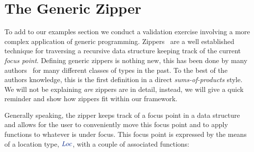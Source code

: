 \documentclass[screen,sigplan]{acmart}%
\newcommand*{\mathcolor}{}
\def\mathcolor#1#{\mathcoloraux{#1}}
\newcommand*{\mathcoloraux}[3]{%
  \protect\leavevmode
  \begingroup
    \color#1{#2}#3%
  \endgroup
}
\newcommand{\HSCon}[1]{\mathcolor{hsblue3}{\mathit{#1}}}
\begin{document}





%
%
\newpage
\appendix

\section{The Generic Zipper}
\label{sec:zipper}

  To add to our examples section we conduct a validation
exercise involving a more complex application of generic
programming. Zippers~\cite{Huet1997} are a well established technique
for traversing a recursive data structure keeping track of the current
\emph{focus point}. Defining generic zippers is nothing new, this has
been done by many authors~\cite{Hinze2004,Adams2010,Yakushev2009} for
many different classes of types in the past. To the best of the
authors knowledge, this is the first definition in a direct
\emph{sums-of-products} style.  We will not be explaining 
\emph{are} zippers are in detail, instead, we will give a quick reminder
and show how zippers fit within our framework.

  Generally speaking, the zipper keeps track of a focus point in a
data structure and allows for the user to conveniently move this focus
point and to apply functions to whatever is under focus.  This focus
point is expressed by the means of a location type, \ensuremath{\HSCon{Loc}}, with a
couple of associated functions:
\end{document}
